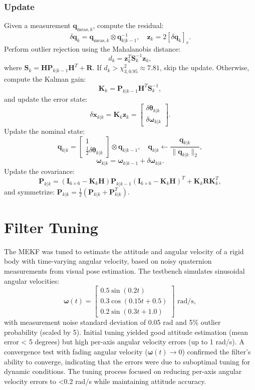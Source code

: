 \documentclass[11pt]{article}
\begin{document}
\subsubsection{Update}
Given a measurement \(\mathbf{q}_{\text{meas},k}\), compute the residual:
\[
\delta \mathbf{q}_k = \mathbf{q}_{\text{meas},k} \otimes \mathbf{q}_{k|k-1}^{-1}, \quad \mathbf{z}_k = 2 [\delta \mathbf{q}_k]_v.
\]
Perform outlier rejection using the Mahalanobis distance:
\[
d_k = \mathbf{z}_k^T \mathbf{S}_k^{-1} \mathbf{z}_k,
\]
where \(\mathbf{S}_k = \mathbf{H} \mathbf{P}_{k|k-1} \mathbf{H}^T + \mathbf{R}\). If \(d_k > \chi^2_{3, 0.95} \approx 7.81\), skip the update. Otherwise, compute the Kalman gain:
\[
\mathbf{K}_k = \mathbf{P}_{k|k-1} \mathbf{H}^T \mathbf{S}_k^{-1},
\]
and update the error state:
\[
\delta \mathbf{x}_{k|k} = \mathbf{K}_k \mathbf{z}_k = \begin{bmatrix} \delta \boldsymbol{\theta}_{k|k} \\ \delta \boldsymbol{\omega}_{k|k} \end{bmatrix}.
\]
Update the nominal state:
\[
\mathbf{q}_{k|k} = \begin{bmatrix} 1 \\ \frac{1}{2} \delta \boldsymbol{\theta}_{k|k} \end{bmatrix} \otimes \mathbf{q}_{k|k-1}, \quad \mathbf{q}_{k|k} \leftarrow \frac{\mathbf{q}_{k|k}}{\|\mathbf{q}_{k|k}\|_2},
\]
\[
\boldsymbol{\omega}_{k|k} = \boldsymbol{\omega}_{k|k-1} + \delta \boldsymbol{\omega}_{k|k}.
\]
Update the covariance:
\[
\mathbf{P}_{k|k} = (\mathbf{I}_{6 \times 6} - \mathbf{K}_k \mathbf{H}) \mathbf{P}_{k|k-1} (\mathbf{I}_{6 \times 6} - \mathbf{K}_k \mathbf{H})^T + \mathbf{K}_k \mathbf{R} \mathbf{K}_k^T,
\]
and symmetrize: \(\mathbf{P}_{k|k} = \frac{1}{2} (\mathbf{P}_{k|k} + \mathbf{P}_{k|k}^T)\).

\section{Filter Tuning}
\label{sec:filter_tuning}

The MEKF was tuned to estimate the attitude and angular velocity of a rigid body with time-varying angular velocity, based on noisy quaternion measurements from visual pose estimation. The testbench simulates sinusoidal angular velocities:
\[
\boldsymbol{\omega}(t) = \begin{bmatrix}
0.5 \sin(0.2 t) \\
0.3 \cos(0.15 t + 0.5) \\
0.2 \sin(0.3 t + 1.0)
\end{bmatrix} \text{ rad/s},
\]
with measurement noise standard deviation of 0.05 rad and 5\% outlier probability (scaled by 5). Initial tuning yielded good attitude estimation (mean error < 5 degrees) but high per-axis angular velocity errors (up to 1 rad/s). A convergence test with fading angular velocity (\(\boldsymbol{\omega}(t) \to 0\)) confirmed the filter’s ability to converge, indicating that the errors were due to suboptimal tuning for dynamic conditions. The tuning process focused on reducing per-axis angular velocity errors to <0.2 rad/s while maintaining attitude accuracy.
\end{document}
